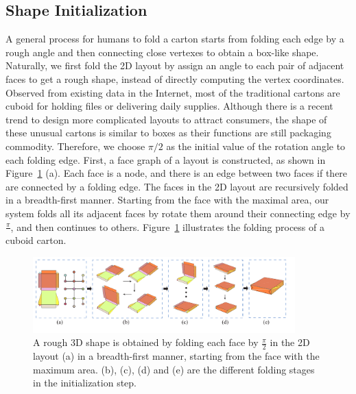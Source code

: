 \subsection{Shape Initialization}\label{sec:initialization}


A general process for humans to fold a carton starts from folding each edge by a rough angle and then connecting close vertexes to obtain a box-like shape. 
Naturally, we first fold the 2D layout by assign an angle to each pair of adjacent faces to get a rough shape, instead of directly computing the vertex coordinates.
%	
Observed from existing data in the Internet, most of the traditional cartons are cuboid for holding files or delivering daily supplies. 
Although there is a recent trend to design more complicated layouts to attract consumers, the shape of these unusual cartons is similar to boxes as their functions are still packaging commodity. 
%
Therefore, we choose $\pi/2$ as the initial value of the rotation angle to each folding edge. 
%
First, a face graph of a layout is constructed, as shown in Figure~\ref{fig:midresult} (a).
Each face is a node, and there is an edge between two faces if there are connected by a folding edge.
%
The faces in the 2D layout are recursively folded in a breadth-first manner.
Starting from the face with the maximal area, our system folds all its adjacent faces by rotate them around their connecting edge by $\frac{\pi}{}$, and then continues to others. 
Figure~\ref{fig:midresult} illustrates the folding process of a cuboid carton. 

\begin{figure}[ht]
	\centering
	\includegraphics[width=0.9\textwidth]{images/midresult}
	\caption{A rough 3D shape is obtained by folding each face by $\frac{\pi}{2}$ in the 2D layout (a) in a breadth-first manner, starting from the face with the maximum area. (b), (c), (d) and (e) are the different folding stages in the initialization step.}
	\label{fig:midresult}
\end{figure}


